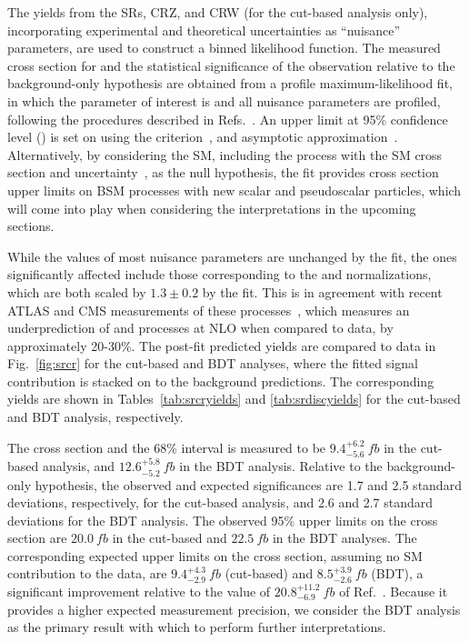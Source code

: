 The yields from the SRs, CRZ, and CRW (for the cut-based analysis only),
incorporating experimental and theoretical uncertainties as ``nuisance''
parameters, are used to construct a binned likelihood function.
The measured cross
section for \tttt and the statistical significance of the observation relative to the
background-only hypothesis are obtained from a profile maximum-likelihood
fit, in which the parameter of interest is \xsectttt and all nuisance
parameters are profiled, following the procedures described in
Refs.~\cite{STAT:ATLPHYSPUB2011011,STAT:PDG}. 
An upper limit at 95\%
confidence level (\CL) is set on \xsectttt using the 
\CLs criterion~\cite{STAT:Junk1999kv,STAT:Read2002hq}, 
and asymptotic approximation~\cite{STAT:Cowan2010js}. 
Alternatively, by considering the SM, including the \tttt process with the SM
cross section and uncertainty~\cite{THEORY:Frederix2017wme}, as the null
hypothesis, the fit provides cross section upper limits on BSM processes with
new scalar and pseudoscalar particles, which will come into play when
considering the interpretations in the upcoming sections.

While the values of most nuisance parameters are unchanged by the
fit, the ones significantly affected include those corresponding to the
\ttW and \ttZ normalizations, which are both scaled by $1.3\pm0.2$ by the
fit. This is in agreement with recent ATLAS and CMS measurements of these
processes~\cite{ATLAS:Aaboud2019njj, CMS:Sirunyan2017uzs, CMS:2019too}, which
measures an underprediction of \ttW and \ttZ processes at NLO when compared to
data, by approximately 20-30\%. The
post-fit predicted yields are compared to
data in Fig.~\ref{fig:srcr} for the cut-based and BDT 
analyses, where the fitted \tttt signal contribution is stacked on to the
background predictions. The corresponding yields are shown in
Tables~\ref{tab:srcryields} and \ref{tab:srdiscyields} for the cut-based and
BDT analysis, respectively.

The \tttt cross section and the 68\% \CL interval is measured to be
$9.4^{+6.2}_{-5.6}~\unit{fb}$ in the cut-based analysis, and
$12.6^{+5.8}_{-5.2}~\unit{fb}$ in the BDT analysis. Relative to the
background-only hypothesis, the observed and expected significances are 1.7
and 2.5 standard deviations, respectively, for the cut-based analysis, and
2.6 and 2.7 standard deviations for the BDT analysis. The observed 95\% \CL
upper limits on the cross section are $20.0~\unit{fb}$ in the cut-based and
$22.5~\unit{fb}$ in the BDT analyses. The corresponding expected upper limits
on the \tttt cross section, assuming no SM \tttt contribution to the data,
are $9.4^{+4.3}_{-2.9}~\unit{fb}$ (cut-based) and $8.5^{+3.9}_{-2.6}~\unit{fb}$
(BDT), a significant improvement relative to the value of
$20.8^{+11.2}_{-6.9}~\unit{fb}$ of Ref.~\cite{CMS:myTOP2016}. Because it 
provides a higher expected measurement precision, we consider the BDT
analysis as the primary result with which to perform further interpretations.

